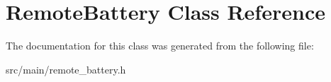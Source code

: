 \hypertarget{class_remote_battery}{}\section{Remote\+Battery Class Reference}
\label{class_remote_battery}


The documentation for this class was generated from the following file\+:\begin{DoxyCompactItemize}
\item 
src/main/remote\+\_\+battery.\+h\end{DoxyCompactItemize}
